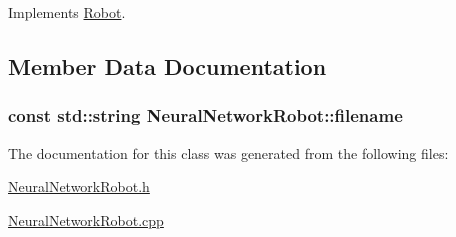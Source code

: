 Implements \hyperlink{classRobot_a3289251979084c50b18a6006547d3f95}{Robot}.



\subsection{Member Data Documentation}
\hypertarget{classNeuralNetworkRobot_a6ccb2a3dcfa6c5616fede96f7468d065}{
\subsubsection[{filename}]{\setlength{\rightskip}{0pt plus 5cm}const std\-::string Neural\-Network\-Robot\-::filename}}\label{classNeuralNetworkRobot_a6ccb2a3dcfa6c5616fede96f7468d065}


The documentation for this class was generated from the following files\-:\begin{DoxyCompactItemize}
\item 
\hyperlink{NeuralNetworkRobot_8h}{Neural\-Network\-Robot.\-h}\item 
\hyperlink{NeuralNetworkRobot_8cpp}{Neural\-Network\-Robot.\-cpp}\end{DoxyCompactItemize}
